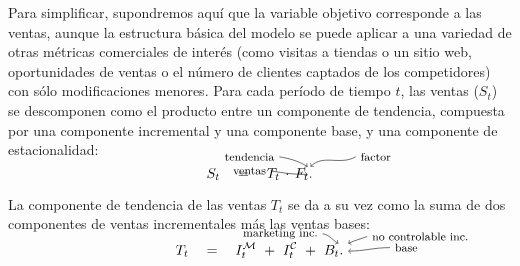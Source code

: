 Para simplificar, supondremos aquí que la variable objetivo corresponde a las ventas, aunque la estructura básica del modelo se puede aplicar a una variedad de otras métricas comerciales de interés (como visitas a tiendas o un sitio web, oportunidades de ventas o el número de clientes captados de los competidores) con sólo modificaciones menores. Para cada período de tiempo $t$, las ventas ($S_t$) se descomponen como el producto entre un componente de tendencia, compuesta por una componente incremental y una componente base, y una componente de estacionalidad: \medskip
\begin{equation*}
\tikzmark{s} S_t ~~~=~~~ \tikzmark{t} T_t \, \cdot \, F_t \tikzmark{p}.
\begin{tikzpicture}[overlay,remember picture]
\node (S1) [left of = s, node distance = 4.5em, yshift=0.5em]{\footnotesize ventas};
\node (S2) [left of = s, node distance = 0em, yshift=0.25em]{};
\draw[->, in=180, out=350] (S1.east) to (S2.west);
\node (T1) [left of = t, node distance = 4.5em, yshift=1.5em]{\footnotesize tendencia};
\node (T2) [left of = t, node distance = 0em, yshift=0.8em]{};
\draw[->, in=150, out=350] (T1.east) to (T2.west);
\node (P1) [right of = p, node distance = 4.5em, yshift=1.5em]{\footnotesize factor};
\node (P2) [right of = p, node distance = -0.5em, yshift=0.8em]{};
\draw[->, in=45, out=210] (P1.west) to (P2.east);
\end{tikzpicture}
\end{equation*}

La componente de tendencia de las ventas $T_t$ se da a su vez como la suma de dos componentes de ventas incrementales más las ventas bases:\medskip
\begin{equation*}
\tikzmark{t} T_t ~~~=~~~ \tikzmark{im} I^\calM_t ~+~ I^\calC_t \tikzmark{ic} ~+~ B_t \tikzmark{b}.
\begin{tikzpicture}[overlay,remember picture]
\node (E1) [left of = im, node distance = 4.5em, yshift=1.5em]{\footnotesize marketing inc.};
\node (E2) [left of = im, node distance = 0em, yshift=0.8em]{};
\draw[->, in=150, out=350] (E1.east) to (E2.west);
\node (T1) [right of = ic, node distance = 5.5em, yshift=1.3em]{\footnotesize no controlable inc.};
\node (T2) [right of = ic, node distance = 0em, yshift=0.8em]{};
\draw[->, in=25, out=200] (T1.west) to (T2.east);
\node (B1) [right of = b, node distance = 4.5em, yshift=0.5em]{\footnotesize base};
\node (B2) [right of = b, node distance = 0em, yshift=0.25em]{};
\draw[->, in=0, out=180] (B1.west) to (B2.east);
\end{tikzpicture}
\end{equation*}

